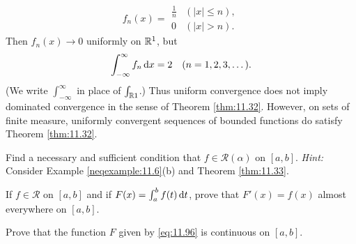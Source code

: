 \begin{myexercise}
    \label{ex:11.6}
    \begin{equation*}
        f_n(x) = \begin{array}{ll}
            \frac{1}{n} & (|x| \leq n), \\
            0           & (|x|    > n).
        \end{array}
    \end{equation*}
    Then $f_n(x) \rightarrow 0$ uniformly on ${\protect\mathbb R}^1$, but
    \begin{equation*}
        \int_{-\infty}^{\infty} f_n \d x = 2
        \quad
        (n = 1,2,3,\dots).
    \end{equation*}
    (We write $\int_{-\infty}^{\infty}$ in place of $\int_{{\protect\mathbb R} 1}$.)
    Thus uniform convergence does not imply dominated convergence in the sense of Theorem \ref{thm:11.32}.
    However, on sets of finite measure, uniformly convergent sequences of bounded functions do satisfy Theorem \ref{thm:11.32}.
\end{myexercise}


\begin{myexercise}
    \label{ex:11.7}
    Find a necessary and sufficient condition that $f \in \mathscr{R}(\alpha)$ on $[a, b]$.
    \emph{Hint:} Consider Example \ref{neqexample:11.6}(b) and Theorem \ref{thm:11.33}.
\end{myexercise}


\begin{myexercise}
    \label{ex:11.8}
    If $f \in \mathscr{R}$ on $[a, b]$
    and if $F(x) = \int_{a}^{b} f(t) \d t$,
    prove that $F'(x) =f(x)$ almost everywhere on $[a, b]$.
\end{myexercise}


\begin{myexercise}
    \label{ex:11.9}
    Prove that the function $F$ given by \eqref{eq:11.96} is continuous on $[a, b]$.
\end{myexercise}



\begin{myexercise}
    \label{ex:11.10}
\end{myexercise}


\begin{myexercise}
    \label{ex:11.11}
\end{myexercise}


\begin{myexercise}
    \label{ex:11.12}
\end{myexercise}


